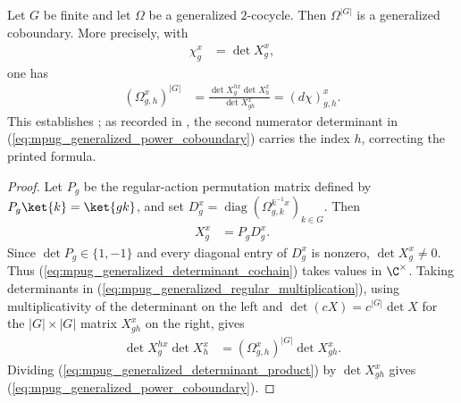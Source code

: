\begin{lemma}
    \label{thm:mpug_generalized_cocycle_power}
    \leanok
    Let $G$ be finite and let $\Omega$ be a generalized $2$-cocycle. Then
    $\Omega^{|G|}$ is a generalized coboundary. More precisely, with
    \begin{align}
        \chi^x_g
         & =\det X^x_g,
        \label{eq:mpug_generalized_determinant_cochain}
    \end{align}
    one has
    \begin{align}
        \left(\Omega^x_{g,h}\right)^{|G|}
         & =\frac{\det X^{h x}_g\det X^x_h}{\det X^x_{gh}}
        =(d\chi)^x_{g,h}.
        \label{eq:mpug_generalized_power_coboundary}
    \end{align}
    This establishes
    \cite[Lemma~\texttt{lemma:G\_cocycle}]{FrancoRubio2025MPUGauging}; as
    recorded in \cite{gap:fbc25_generalized_cocycle_determinant_typo}, the
    second numerator determinant in
    (\ref{eq:mpug_generalized_power_coboundary}) carries the index $h$,
    correcting the printed formula.

\end{lemma}

\begin{proof}\leanok
    Let $P_g$ be the regular-action permutation matrix defined by
    $P_g\ket{k}=\ket{gk}$, and set
    $D^x_g=\operatorname{diag}(\Omega^{k^{-1}x}_{g,k})_{k\in G}$.
    Then
    \begin{align}
        X^x_g
         & =P_gD^x_g.
    \end{align}
    Since $\det P_g\in\{1,-1\}$ and every diagonal entry of $D^x_g$
    is nonzero, $\det X^x_g\ne0$. Thus
    (\ref{eq:mpug_generalized_determinant_cochain}) takes values in
    $\C^\times$. Taking determinants in
    (\ref{eq:mpug_generalized_regular_multiplication}), using
    multiplicativity of the determinant on the left and
    $\det(cX)=c^{|G|}\det X$ for the $|G|\times|G|$ matrix $X^x_{gh}$ on the
    right, gives
    \begin{align}
        \det X^{h x}_g\det X^x_h
         & =\left(\Omega^x_{g,h}\right)^{|G|}\det X^x_{gh}.
        \label{eq:mpug_generalized_determinant_product}
    \end{align}
    Dividing (\ref{eq:mpug_generalized_determinant_product}) by
    $\det X^x_{gh}$ gives
    (\ref{eq:mpug_generalized_power_coboundary}).
\end{proof}


